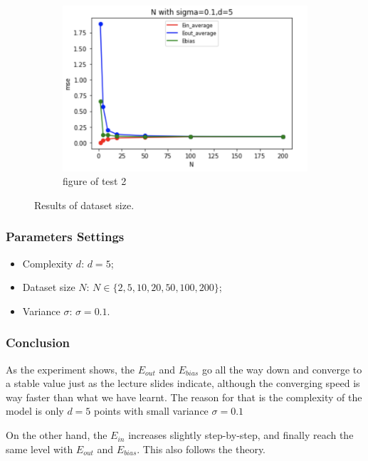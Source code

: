 \documentclass[12pt,letterpaper]{article}
\begin{document}
\begin{figure}[h]
\begin{subfigure}{.45\textwidth}
  \label{fig:sub2}
\end{subfigure}
\begin{subfigure}{.55\textwidth}
  \centering
  \includegraphics[width=.9\linewidth]{lzsig01d5.png}
  \caption{\small figure of test 2}
  \label{fig:sub2}
\end{subfigure}
\caption{\small Results of dataset size.}
\label{fig:size_nonreg}
\end{figure}

\subsubsection*{Parameters Settings}
\begin{itemize}
    \item Complexity $d$: $d = 5$;
    \item Dataset size $N$: $N \in \{ 2,5,10,20,50,100,200 \}$;
    \item Variance $\sigma$: $\sigma = 0.1$.
\end{itemize}

\subsubsection*{Conclusion}

As the experiment shows, the $E_{out}$ and $E_{bias}$ go all the way down and converge to a stable value just as the lecture slides indicate, although the converging speed is way faster than what we have learnt. The reason for that is the complexity of the model is only $d = 5$ points with small variance $\sigma = 0.1$

On the other hand, the $E_{in}$ increases slightly step-by-step, and finally reach the same level with $E_{out}$ and $E_{bias}$. This also follows the theory.
\end{document}
